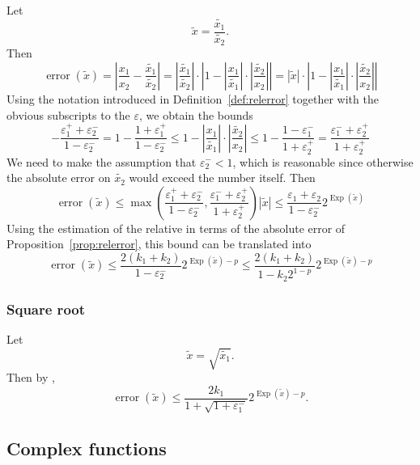 \documentclass [12pt]{article}
\newcommand {\corr}[1]{{#1}}
\newcommand {\appro}[1]{\widetilde {#1}}
\DeclareMathOperator{\Exp}{\operatorname {Exp}}
\newcommand{\error}{\operatorname {error}}
\renewcommand {\epsilon}{\varepsilon}
\renewcommand {\leq}{\leqslant}
\begin{document}
Let
\[
\appro x = \frac {\appro {x_1}}{\appro {x_2}}.
\]
Then
\[
\error (\appro x) = \left|
\frac {\corr {x_1}}{\corr {x_2}} - \frac {\appro {x_1}}{\appro {x_2}} \right|
= \left| \frac {\appro {x_1}}{\appro {x_2}} \right|
\cdot \left|
1 - \left| \frac {\corr {x_1}}{\appro {x_1}} \right|
   \cdot \left| \frac {\appro {x_2}}{\corr {x_2}} \right|
\right|
= | \appro x |
\cdot \left|
1 - \left| \frac {\corr {x_1}}{\appro {x_1}} \right|
   \cdot \left| \frac {\appro {x_2}}{\corr {x_2}} \right|
\right|
\]
Using the notation introduced in Definition~\ref {def:relerror} together
with the obvious subscripts to the $\epsilon$, we obtain the bounds
\[
- \frac {\epsilon_1^+ + \epsilon_2^-}{1 - \epsilon_2^-}
=
1 - \frac {1 + \epsilon_1^+}{1 - \epsilon_2^-}
\leq
1 - \left| \frac {\corr {x_1}}{\appro {x_1}} \right|
   \cdot \left| \frac {\appro {x_2}}{\corr {x_2}} \right|
\leq
1 - \frac {1 - \epsilon_1^-}{1 + \epsilon_2^+}
=
\frac {\epsilon_1^- + \epsilon_2^+}{1 + \epsilon_2^+}
\]
We need to make the assumption that $\epsilon_2^- < 1$, which is reasonable
since otherwise the absolute error on $\appro {x_2}$ would exceed the number
itself. Then
\[
\error (\appro x)
\leq
\max \left(
   \frac {\epsilon_1^+ + \epsilon_2^-}{1 - \epsilon_2^-},
   \frac {\epsilon_1^- + \epsilon_2^+}{1 + \epsilon_2^+}
\right) |\appro x|
\leq
\frac {\epsilon_1 + \epsilon_2}{1 - \epsilon_2^-} 2^{\Exp (\appro x)}
\]
Using the estimation of the relative in terms of the absolute error of
Proposition~\ref {prop:relerror}, this bound can be translated into
\begin {equation}
\label {eq:proprealdiv}
\error (\appro x)
\leq
\frac {2 (k_1 + k_2)}{1 - \epsilon_2^-} 2^{\Exp (\appro x) - p}
\leq
\frac {2 (k_1 + k_2)}{1 - k_2 2^{1 - p}} 2^{\Exp (\appro x) - p}
\end {equation}


\subsubsection {Square root}
\label {sssec:proprealsqrt}

Let
\[
\appro x = \sqrt {\appro {x_1}}.
\]
Then by \cite[\S1.7]{MPFRAlgorithms},
\begin {equation}
\label {eq:proprealsqrt}
\error (\appro x)
\leq
\frac {2 k_1}{1 + \sqrt {1 + \epsilon_1^-}} 2^{\Exp (\appro x) - p}.
\end {equation}



\subsection {Complex functions}
\end{document}
